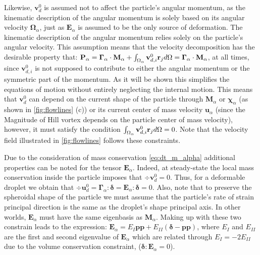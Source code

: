 Likewise, $\textbf{v}_d^0$ is assumed not to affect the particle's angular momentum, as the kinematic description of the angular momentum is solely based on its angular velocity $\bm\Omega_\alpha$, just as $\textbf{E}_\alpha$ is assumed to be the only source of deformation. 
The kinematic description of the angular momentum relies solely on the particle's angular velocity.
This assumption means that the velocity decomposition has the desirable property that: $\textbf{P}_\alpha = \bm\Gamma_\alpha \cdot \textbf{M}_\alpha + \int_{\Omega_{\alpha}} \textbf{v}^0_{d,i} \textbf{r}_j d\Omega =  \bm\Gamma_\alpha \cdot \textbf{M}_\alpha $, at all times, since $\textbf{v}^0_{d,i} $ is not supposed to contribute to either the angular momentum or the symmetric part of the momentum. 
As it will be shown this simplifies the equations of motion without entirely neglecting the internal motion.
This means that $\textbf{v}^0_{d}$ can depend on the current shape of the particle through $\textbf{M}_\alpha$ or $\bm\chi_\alpha$ (as shown in \ref{fig:flowlines} (c)) or its current center of mass velocity $\textbf{u}_\alpha$ (since the Magnitude of Hill vortex depends on the particle center of mass velocity), however, it must satisfy the condition $\int_{\Omega_{\alpha}} \textbf{v}^0_{d,i} \textbf{r}_j d\Omega  = 0$.
Note that the velocity field illustrated in \ref{fig:flowlines} follows these constraints. 

Due to the consideration of mass conservation \eqref{eq:dt_m_alpha} additional properties can be noted for the tensor $\textbf{E}_\alpha$.
Indeed, at steady-state the local mass conservation inside the particle imposes that $\div \textbf{v}_d^0 = 0$. 
Thus, for a deformable droplet we obtain that $\div \textbf{u}_d^0 = \bm\Gamma_\alpha : \bm\delta = \textbf{E}_\alpha : \bm\delta =  0$.  
Also, note that to preserve the spheroidal shape of the particle we must assume that the particle's rate of strain principal direction is the same as the droplet's shape principal axis. 
In other worlds, $\textbf{E}_\alpha$ must have the same eigenbasis as $\textbf{M}_\alpha$. 
Making up with these two constrain leads to the expression: $\textbf{E}_\alpha = E_I \textbf{pp} + E_{II} (\bm\delta - \textbf{pp})$, where $E_I$ and $E_{II}$ are the first and second eigenvalue of $\textbf{E}_\alpha$ which are related through $E_I = - 2E_{II}$ due to the volume conservation constraint, ($\bm\delta : \textbf{E}_\alpha =0$). 


